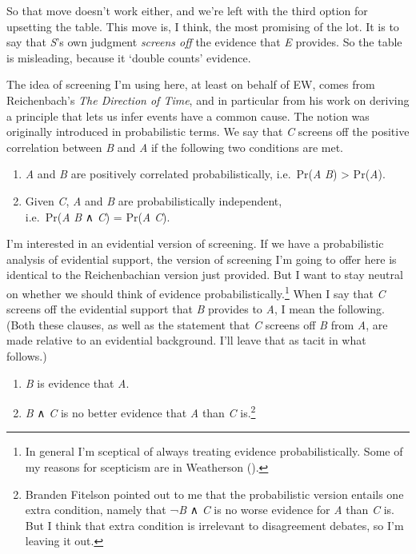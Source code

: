 \documentclass[
  10pt,
  letterpaper,
  DIV=11,
  numbers=noendperiod,
  twoside]{scrartcl}
\providecommand{\tightlist}{%
  \setlength{\itemsep}{0pt}\setlength{\parskip}{0pt}}\usepackage{longtable,booktabs,array}
\begin{document}
So that move doesn't work either, and we're left with the third option
for upsetting the table. This move is, I think, the most promising of
the lot. It is to say that \emph{S}'s own judgment \emph{screens off}
the evidence that \emph{E} provides. So the table is misleading, because
it `double counts' evidence.

The idea of screening I'm using here, at least on behalf of EW, comes
from Reichenbach's \emph{The Direction of Time}, and in particular from
his work on deriving a principle that lets us infer events have a common
cause. The notion was originally introduced in probabilistic terms. We
say that \emph{C} screens off the positive correlation between \emph{B}
and \emph{A} if the following two conditions are met.

\begin{enumerate}
\def\labelenumi{\arabic{enumi}.}
\tightlist
\item
  \emph{A} and \emph{B} are positively correlated probabilistically,
  i.e.~Pr(\emph{A} \textbar{} \emph{B}) \textgreater{} Pr(\emph{A}).
\item
  Given \emph{C}, \emph{A} and \emph{B} are probabilistically
  independent,\\
  i.e.~Pr(\emph{A} \textbar{} \emph{B} ∧ \emph{C}) = Pr(\emph{A}
  \textbar{} \emph{C}).
\end{enumerate}

I'm interested in an evidential version of screening. If we have a
probabilistic analysis of evidential support, the version of screening
I'm going to offer here is identical to the Reichenbachian version just
provided. But I want to stay neutral on whether we should think of
evidence probabilistically.\footnote{In general I'm sceptical of always
  treating evidence probabilistically. Some of my reasons for scepticism
  are in Weatherson ().} When I say
that \emph{C} screens off the evidential support that \emph{B} provides
to \emph{A}, I mean the following. (Both these clauses, as well as the
statement that \emph{C} screens off \emph{B} from \emph{A}, are made
relative to an evidential background. I'll leave that as tacit in what
follows.)

\begin{enumerate}
\def\labelenumi{\arabic{enumi}.}
\tightlist
\item
  \emph{B} is evidence that \emph{A}.
\item
  \emph{B} ∧ \emph{C} is no better evidence that \emph{A} than \emph{C}
  is.\footnote{Branden Fitelson pointed out to me that the probabilistic
    version entails one extra condition, namely that ¬\emph{B} ∧
    \emph{C} is no worse evidence for \emph{A} than \emph{C} is. But I
    think that extra condition is irrelevant to disagreement debates, so
    I'm leaving it out.}
\end{enumerate}
\end{document}
